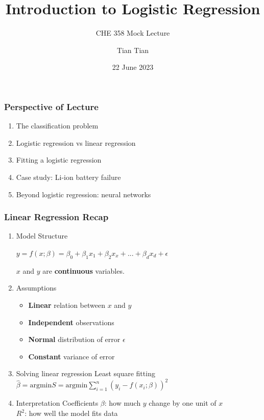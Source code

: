 \documentclass[10pt,aspectratio=169]{beamer}
\title{\Large \bfseries Introduction to Logistic Regression}
\subtitle{\large CHE 358 Mock Lecture}
\author{\large Tian Tian}
\date{\large 22 June 2023}
\begin{document}
{
\frame{\titlepage}
}


\begin{frame}[c]
\frametitle{Perspective of Lecture}
\begin{enumerate}
\item The classification problem
\vfill \item Logistic regression vs linear regression
\vfill \item Fitting a logistic regression
\vfill \item Case study: Li-ion battery failure
\vfill \item Beyond logistic regression: neural networks
\end{enumerate}
\end{frame}


\begin{frame}
  \frametitle{Linear Regression Recap}
  \begin{enumerate}
  \item Model Structure

    \vfill
    $y = f(x; \beta) =  β_{0} + β_{1} x_{1} + β_{2} x_{x} + ... + β_{d} x_{d} + \epsilon$

    $x$ and $y$ are \textbf{continuous} variables.
    
    \vfill \item Assumptions

    \vfill
    \begin{itemize}
    \item \textbf{Linear} relation between $x$ and $y$
    \item \textbf{Independent} observations
    \item \textbf{Normal} distribution of error $\epsilon$
    \item \textbf{Constant} variance of error
    \end{itemize}


 
    \vfill \item Solving linear regression
        \vfill
    Least square fitting $\hat{\beta} = \mathrm{argmin} S = \mathrm{argmin} \sum_{i=1}^{n} (y_{i} - f(x_{i}; \beta))^{2}$
    
    \vfill \item Interpretation
    \vfill
    Coefficients $\beta$: how much $y$ change by one unit of $x$\\
    $R^{2}$: how well the model fits data
    
    
  \end{enumerate}

\end{frame}
\end{document}

